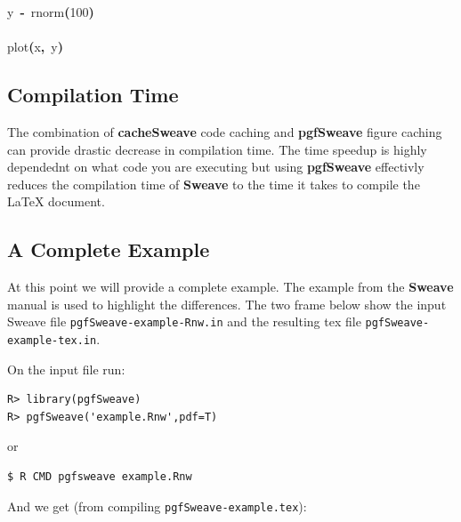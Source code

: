 \documentclass{article}
\newcommand{\pkg}{\textbf}
\newcommand{\hlnumber}[1]{\textcolor[rgb]{0.0823529411764706,0.0784313725490196,0.709803921568627}{#1}}%
\newcommand{\hlfunctioncall}[1]{\textcolor[rgb]{1,0,0}{#1}}%
\newcommand{\hlkeyword}[1]{\textcolor[rgb]{0,0,0}{\textbf{#1}}}%
\newcommand{\hlassignement}[1]{\textcolor[rgb]{0.215686274509804,0.215686274509804,0.384313725490196}{\textbf{#1}}}%
\newcommand{\hlsymbol}[1]{\textcolor[rgb]{0,0,0}{#1}}%
\newcommand{\hlprompt}[1]{\textcolor[rgb]{0,0,0}{#1}}%
\newcommand{\hlstd}[1]{\textcolor[rgb]{0,0,0}{#1}}%
\begin{document}
\hlprompt{\usebox{\hlnormalsizeboxgreaterthan}{\ }}\hlsymbol{y}{\ }\hlassignement{\usebox{\hlnormalsizeboxlessthan}-}{\ }\hlfunctioncall{rnorm}\hlkeyword{(}\hlnumber{100}\hlkeyword{)}\mbox{}
\normalfont
\hspace*{\fill}\\
\hlstd{}\usebox{\hlnormalsizeboxgreaterthan}{\ }
\hspace*{\fill}\\
\hlstd{}\ttfamily\noindent
\hlprompt{\usebox{\hlnormalsizeboxgreaterthan}{\ }}\hlfunctioncall{plot}\hlkeyword{(}\hlsymbol{x}\hlkeyword{,}{\ }\hlsymbol{y}\hlkeyword{)}\mbox{}
\normalfont
\hspace*{\fill}\\
\hlstd{}


\subsection{Compilation Time}
The combination of \pkg{cacheSweave} code caching and \pkg{pgfSweave} figure caching can provide drastic decrease in compilation time.  The time speedup is highly dependednt on what code you are executing but using \pkg{pgfSweave} effectivly reduces the compilation time of \pkg{Sweave} to the time it takes to compile the \LaTeX{} document. 

\subsection{A Complete Example}
At this point we will provide a complete example.  The example from the \pkg{Sweave} manual is used to highlight the differences. The two frame below show the input Sweave file \texttt{pgfSweave-example-Rnw.in} and the resulting tex file \texttt{pgfSweave-example-tex.in}.


On the input file run:
\begin{Verbatim}
R> library(pgfSweave)
R> pgfSweave('example.Rnw',pdf=T)
\end{Verbatim}

or 

\begin{Verbatim}
$ R CMD pgfsweave example.Rnw
\end{Verbatim}

And we get (from compiling \texttt{pgfSweave-example.tex}):

\end{document}
